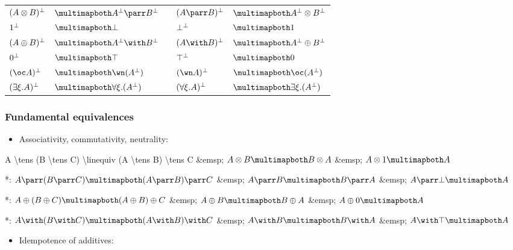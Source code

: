 \begin{longtable}[]{@{}lllll@{}}
\toprule
\(( A \otimes B )^\bot\) & \(\linequiv A\orth \parr B\orth\) & &
\(( A \parr B )\orth\) &
\(\linequiv A\orth \tens B\orth\)\tabularnewline
\(1^\bot\) & \(\linequiv \bot\) & & \(\bot^\bot\) &
\(\linequiv \one\)\tabularnewline
\(( A \oplus B )^\bot\) & \(\linequiv A\orth \with B\orth\) & &
\(( A \with B )\orth\) &
\(\linequiv A\orth \plus B\orth\)\tabularnewline
\(0^\bot\) & \(\linequiv \top\) & & \(\top^\bot\) &
\(\linequiv \zero\)\tabularnewline
\(( \oc A )\orth\) & \(\linequiv \wn ( A\orth )\) & & \(( \wn A )\orth\)
& \(\linequiv \oc ( A\orth )\)\tabularnewline
\(( \exists \xi.A )^\bot\) & \(\linequiv \forall \xi.( A\orth )\) & &
\(( \forall \xi.A )^\bot\) &
\(\linequiv \exists \xi.( A\orth )\)\tabularnewline
\bottomrule
\end{longtable}

\subsubsection{Fundamental equivalences}\label{fundamental-equivalences}

\begin{itemize}
\tightlist
\item
  Associativity, commutativity, neutrality:

  \begin{description}
  \tightlist
  \item[]
  \end{description}
\end{itemize}

A \textbackslash{}tens (B \textbackslash{}tens C)
\textbackslash{}linequiv (A \textbackslash{}tens B) \textbackslash{}tens
C \&emsp; \(A \tens B \linequiv B \tens A\) \&emsp;
\(A \tens \one \linequiv A\)

*: \(A \parr (B \parr C) \linequiv (A \parr B) \parr C\) \&emsp;
\(A \parr B \linequiv B \parr A\) \&emsp; \(A \parr \bot \linequiv A\)

*: \(A \plus (B \plus C) \linequiv (A \plus B) \plus C\) \&emsp;
\(A \plus B \linequiv B \plus A\) \&emsp; \(A \plus \zero \linequiv A\)

*: \(A \with (B \with C) \linequiv (A \with B) \with C\) \&emsp;
\(A \with B \linequiv B \with A\) \&emsp; \(A \with \top \linequiv A\)

\begin{itemize}
\tightlist
\item
  Idempotence of additives:

  \begin{description}
  \tightlist
  \item[]
  \end{description}
\end{itemize}

